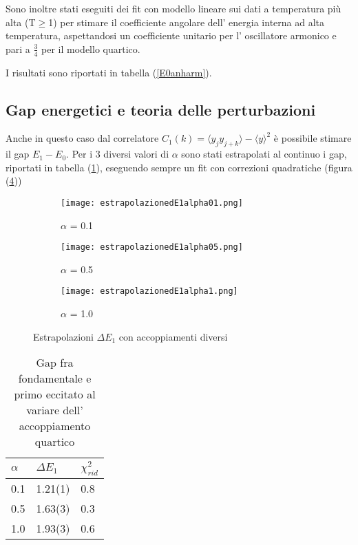 \documentclass{article}
\begin{document}
Sono inoltre stati eseguiti dei fit con modello lineare sui dati a temperatura più alta (T$\geq$1) per stimare il coefficiente angolare dell' energia interna ad alta temperatura, aspettandosi un coefficiente unitario per l' oscillatore armonico e pari a $\frac{3}{4}$ per il modello quartico.

I risultati sono riportati in tabella (\ref{E0anharm}).



\subsection{Gap energetici e teoria delle perturbazioni}

Anche in questo caso dal correlatore $C_1(k)=\langle y_jy_{j+k}\rangle - \langle y\rangle^2$ è possibile stimare il gap $E_1-E_0$. Per i 3 diversi valori di $\alpha$ sono stati estrapolati al continuo i gap, riportati in tabella (\ref{deltae1anharm}), eseguendo sempre un fit con correzioni quadratiche (figura (\ref{fig:estrapanharmde1}))

\begin{figure}[h]
     \centering
     \begin{subfigure}[b]{0.48\textwidth}
         \centering
         \texttt{[image: estrapolazionedE1alpha01.png]}
         \caption{$\alpha$ = 0.1}
         \label{fig:de1alpha01}
     \end{subfigure}
     \hfill
     \begin{subfigure}[b]{0.48\textwidth}
         \centering
         \texttt{[image: estrapolazionedE1alpha05.png]}
         \caption{$\alpha$ = 0.5}
         \label{fig:de1alpha05}
     \end{subfigure}
     \hfill
     \begin{subfigure}[b]{0.48\textwidth}
         \centering
         \texttt{[image: estrapolazionedE1alpha1.png]}
         \caption{$\alpha$ = 1.0}
         \label{fig:de1alpha1}
     \end{subfigure}
     \hfill
        \caption{Estrapolazioni $\Delta E_1$ con accoppiamenti diversi}
        \label{fig:estrapanharmde1}
\end{figure}

\begin{table}[h]
\centering
\begin{tabular}{lll}
$\alpha$ & $\Delta E_1$    & $\chi^2_{rid}$\\ \hline
\hline
0.1      & 1.21(1) & 0.8      \\
0.5      & 1.63(3) & 0.3     \\
1.0      & 1.93(3) & 0.6                
\end{tabular}
\caption{Gap fra fondamentale e primo eccitato al variare dell' accoppiamento quartico}
\label{deltae1anharm}
\end{table}
\end{document}
